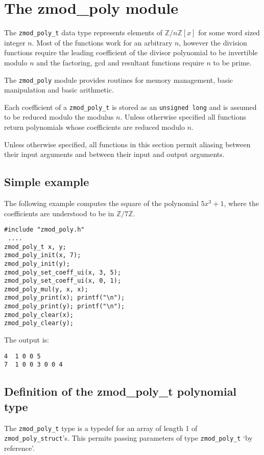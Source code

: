 \documentclass[a4paper,10pt]{article}
\newcommand{\Z}{\mathbb{Z}}
\newcommand{\code}{\lstinline}
\begin{document}
\section{The zmod\_poly module}

The \code{zmod_poly_t} data type represents elements of $\Z/n\Z[x]$ for some word sized integer $n$. Most of the functions work for an arbitrary $n$, however the division functions require the leading coefficient of the divisor polynomial to be invertible modulo $n$ and the factoring, gcd and resultant functions require $n$ to be prime.

The \code{zmod_poly} module provides routines for memory management, basic manipulation and basic arithmetic.

Each coefficient of a \code{zmod_poly_t} is stored as an \code{unsigned long} and is assumed to be reduced modulo the modulus $n$. Unless otherwise specified all functions return polynomials whose coefficients are reduced modulo $n$.

Unless otherwise specified, all functions in this section permit aliasing between their input arguments and between their input and output arguments. 

\subsection{Simple example}

The following example computes the square of the polynomial $5x^3 + 1$, where the coefficients are understood to be in $\Z/7\Z$.

\begin{lstlisting}
#include "zmod_poly.h"
 ....
zmod_poly_t x, y;
zmod_poly_init(x, 7);
zmod_poly_init(y);
zmod_poly_set_coeff_ui(x, 3, 5);
zmod_poly_set_coeff_ui(x, 0, 1);
zmod_poly_mul(y, x, x);
zmod_poly_print(x); printf("\n");
zmod_poly_print(y); printf("\n");
zmod_poly_clear(x);
zmod_poly_clear(y);
\end{lstlisting}

The output is:

\begin{lstlisting}
4  1 0 0 5
7  1 0 0 3 0 0 4
\end{lstlisting}

\subsection{Definition of the zmod\_poly\_t polynomial type}

The \code{zmod_poly_t} type is a typedef for an array of length 1 of \code{zmod_poly_struct}'s. This permits passing parameters  of type \code{zmod_poly_t} `by reference'. 
\end{document}
